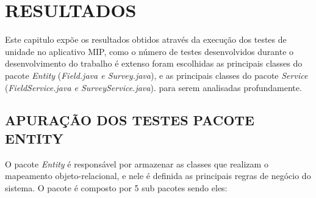 
\chapter{RESULTADOS}

Este capitulo expõe os resultados obtidos através da execução dos testes de unidade no aplicativo MIP, como o número de testes desenvolvidos durante o desenvolvimento do trabalho é extenso foram escolhidas as principais classes do pacote \textit{Entity} (\textit{Field.java e Survey.java}), e as principais classes do pacote \textit{Service} (\textit{FieldService.java e SurveyService.java}). para serem analisadas profundamente. 


\section{APURAÇÃO DOS TESTES PACOTE ENTITY}

O pacote \textit{Entity} é responsável por armazenar as classes que realizam o mapeamento objeto-relacional, e nele é definida as principais regras de negócio do sistema. O pacote é composto por 5 sub pacotes sendo eles: 

